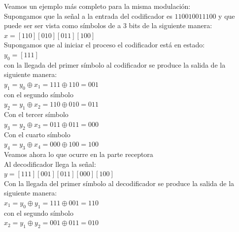 Veamos un ejemplo más completo para la misma modulación:\\

Supongamos que la señal a la entrada del codificador es $110010011100$ y que puede ser ser vista como símbolos de a 3 bits de la siguiente manera:\\

$x=[110] [010] [011] [100]$\\

Supongamos que al iniciar el proceso el codificador está en estado:\\

$y_0=[111]$\\

con la llegada del primer símbolo al codificador se produce la salida de la siguiente manera:\\

$y_1=y_0 \oplus x_1 = 111 \oplus 110=001$\\

con el segundo símbolo\\

$y_2=y_1 \oplus x_2 = 110 \oplus 010=011$\\

Con el tercer símbolo\\

$y_3=y_2 \oplus x_3 = 011 \oplus 011=000$\\

Con el cuarto símbolo\\

$y_4=y_3 \oplus x_4 = 000 \oplus 100=100$\\

Veamos ahora lo que ocurre en la parte receptora\\

Al decodificador llega la señal:\\

$y=[111] [001] [011] [000] [100]$\\

Con la llegada del primer símbolo al decodificador se produce la salida de la siguiente manera:\\

$x_1=y_0 \oplus y_1 =111 \oplus 001=110$\\

con el segundo símbolo\\

$x_2=y_1 \oplus y_2 =001 \oplus 011=010$\\

